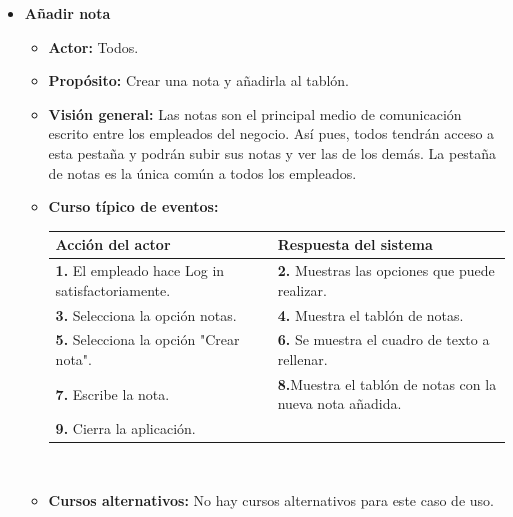 \documentclass[spanish,a4paper,12pt]{report}		%
\begin{document}
\begin{itemize}
	\newpage
	\hspace{0.5 true cm}	
	\item \textbf{Añadir nota} 
			\begin{itemize}
			\item \textbf{Actor:} Todos.
			\item \textbf{Propósito: } Crear una nota y añadirla al tablón.
			\item \textbf{Visión general:} Las notas son el principal medio de comunicación escrito entre los empleados del negocio. 		Así pues, todos tendrán acceso a esta pestaña y podrán subir sus notas y ver las de los demás. La
pestaña de notas es la única común a todos los empleados.
			\item \textbf{Curso típico de eventos:} 	\\
				\begin{tabular}{|p{6cm}||p{6cm}|}
				\hline
				\textbf{Acción del actor} & \textbf{Respuesta del sistema} \\ \hline \hline
				\textbf{1.}    El empleado hace Log in satisfactoriamente. & \textbf{2.} Muestras las opciones que puede realizar. \\ \hline
				\textbf{3.} Selecciona la opción notas. & \textbf{4.} Muestra el tablón de notas. \\ \hline
				\textbf{5.} Selecciona la opción "Crear nota".	& \textbf{6.} Se muestra el cuadro de texto a rellenar. \\ \hline
				\textbf{7.} Escribe la nota.	& \textbf{8.}Muestra el tablón de notas con la nueva nota añadida. \\ \hline
				\textbf{9.} Cierra la aplicación. &  \\ \hline
			\end{tabular}
			\\
			\item \textbf{Cursos alternativos:} No hay cursos alternativos para este caso de uso.
		\end {itemize}



\end{itemize}
\end{document}
